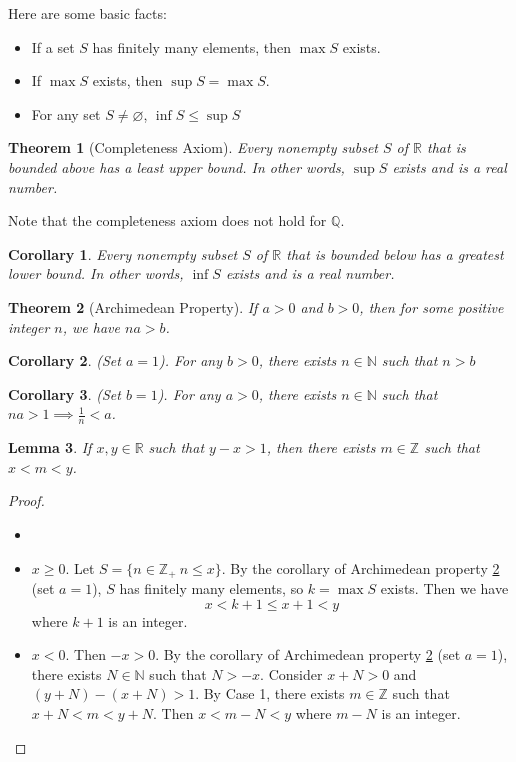\documentclass[12pt, lettersize]{book}
\theoremstyle{plain}
\newtheorem{thm}{Theorem}[section]
\newtheorem{lem}[thm]{Lemma}
\newtheorem{cor}{Corollary}[thm]
\theoremstyle{definition}
\theoremstyle{remark}
\newcommand{\R}{\mathbb{R}}
\newcommand{\N}{\mathbb{N}}
\newcommand{\Q}{\mathbb{Q}}
\newcommand{\Z}{\mathbb{Z}}
\let\emptyset\varnothing
\begin{document}
		Here are some basic facts:
		\begin{itemize}
			\item If a set $S$ has finitely many elements, then $\max S$ exists.
			\item If $\max S$ exists, then $\sup S=\max S$.
			\item For any set $S\neq\emptyset$, $\inf S\leq \sup S$
		\end{itemize}
		
		\begin{thm}[Completeness Axiom]\label{thm:4.4}
		Every nonempty subset $S$ of $\R$ that is bounded above has a least upper bound. In other words, $\sup S$ exists and is a real number.
		\end{thm}
		Note that the completeness axiom does not hold for $\Q$. 
		\begin{cor}
		Every nonempty subset $S$ of $\R$ that is bounded below has a greatest lower bound. In other words, $\inf S$ exists and is a real number.
		\end{cor}
		
		\begin{thm}[Archimedean Property]\label{thm:4.6}
		If $a>0$ and $b>0$, then for some positive integer $n$, we have $na>b$.
		\end{thm}
	 	\begin{cor}
	 	(Set $a=1$). For any $b>0$, there exists $n\in\N$ such that $n>b$
	 	\end{cor}
 		\begin{cor}
 		(Set $b=1$). For any $a>0$, there exists $n\in\N$ such that $na>1\implies \frac{1}{n}<a$.
 		\end{cor}
		
		\begin{lem}\label{lem:4.7}
		If $x,y\in\R$ such that $y-x>1$, then there exists $m\in\Z$ such that $x<m<y$.
		\end{lem}
		\begin{proof}
		\begin{itemize}
			\item[]
			\item[Case 1:] $x\geq0$. Let $S=\{n\in\Z_+\: n\leq x\}$. By the corollary of Archimedean property \ref{thm:4.6} (set $a=1$), $S$ has finitely many elements, so $k=\max S$ exists. Then we have
			\begin{displaymath}
				x<k+1\leq x+1<y
			\end{displaymath}
			where $k+1$ is an integer.
			\item[Case 2:] $x<0$. Then $-x>0$. By the corollary of Archimedean property \ref{thm:4.6} (set $a=1$), there exists $N\in\N$ such that $N>-x$. Consider $x+N>0$ and $(y+N)-(x+N)>1$. By Case 1, there exists $m\in\Z$ such that $x+N<m<y+N$. Then $x<m-N<y$ where $m-N$ is an integer.
		\end{itemize}
		\end{proof}
		
\end{document}
